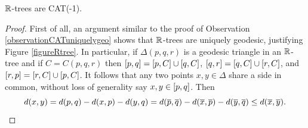 %
%
%
%
%
\begin{observation}
\label{observationRtreesCAT}
$\R$-trees are CAT(-1).
\end{observation}
\begin{proof}
First of all, an argument similar to the proof of Observation \ref{observationCATuniquelygeo} shows that $\R$-trees are uniquely geodesic, justifying Figure \ref{figureRtree}. In particular, if $\Delta(p,q,r)$ is a geodesic triangle in an $\R$-tree and if $C = C(p,q,r)$ then $[p,q] = [p,C]\cup[q,C]$, $[q,r] = [q,C]\cup[r,C]$, and $[r,p] = [r,C]\cup[p,C]$. It follows that any two points $x,y\in \Delta$ share a side in common, without loss of generality say $x,y\in[p,q]$. Then
\[
d(x,y) = d(p,q) - d(x,p) - d(y,q) = d(\overline p,\overline q) - d(\overline x,\overline p) - d(\overline y,\overline q) \leq d(\overline x,\overline y).
\]
\end{proof}

